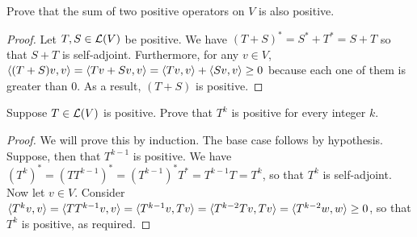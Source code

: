 \begin{exercise}{5}
  Prove that the sum of two positive operators on $V$ is also positive.
\end{exercise}
\begin{proof}
 Let $T,S\in\mathcal{L}(V)$ be positive. We have $(T+S)^\ast =S^\ast +T^\ast =S+T$ so that $S+T$ is self-adjoint. Furthermore, for any $v\in V$, $\langle (T+S)v,v\rangle= \langle Tv+Sv,v\rangle =\langle Tv,v\rangle+\langle Sv,v\rangle\geq 0$ because each one of them is greater than 0. As a result, $(T+S)$ is positive.
\end{proof}

\begin{exercise}{6}
  Suppose $T\in\mathcal{L}(V)$ is positive. Prove that $T^k$ is positive for every integer $k$.
\end{exercise}
\begin{proof}
 We will prove this by induction. The base case follows by hypothesis. Suppose, then that $T^{k-1}$ is positive. We have $(T^k)^\ast =(TT^{k-1})^\ast =(T^{k-1})^\ast T^\ast =T^{k-1}T =T^k$, so that $T^k$ is self-adjoint. Now let $v\in V$. Consider $\langle T^kv, v\rangle =\langle TT^{k-1}v,v\rangle =\langle T^{k-1}v, Tv\rangle =\langle T^{k-2}Tv, Tv\rangle =\langle T^{k-2}w, w\rangle\geq 0$, so that $T^k$ is positive, as required.
\end{proof}

